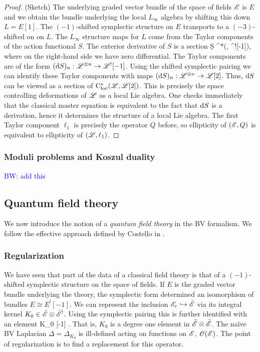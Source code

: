 \documentclass[10pt]{amsart}
\def\brian{\textcolor{blue}{BW: }\textcolor{blue}}
\begin{document}
\begin{proof} (Sketch) 
The underlying graded vector bundle of the space of fields $\mathscr E$ is $E$ and we obtain the bundle underlying the local $L_\infty$ algebra by shifting this down $L = E[1]$. 
The $(-1)$-shifted symplectic structure on $E$ transports to a $(-3)$-shifted on on $L$. 
The $L_\infty$ structure maps for $L$ come from the Taylor components of the action functional $S$. 
The exterior derivative of $S$ is a section
\ben
\d S \in \cloc^*(\sL, \sL^![-1]),
\een
where on the right-hand side we have zero differential.
The Taylor components are of the form $({\rm d} S)_n : \mathscr L^{\otimes n} \to \mathscr L^![-1]$. 
Using the shifted symplectic pairing we can identify these Taylor components with maps $({\rm d} S)_n : \mathscr L^{\otimes n} \to \mathscr L[2]$. 
Thus, ${\rm d} S$ can be viewed as a section of ${\rm C}_{\rm loc}^*(\mathscr L, \mathscr L[2])$. 
This is precisely the space controlling deformations of $\mathscr L$ as a local Lie algebra.
One checks immediately that the classical master equation is equivalent to the fact that ${\rm d} S$ is a derivation, hence it determines the structure of a local Lie algebra. 
The first Taylor component $\ell_1$ is precisely the operator $Q$ before, so ellipticity of $(\mathscr E, Q)$ is equivalent to ellipticity of $(\mathscr L, \ell_1)$. 
\end{proof}


\subsubsection{Moduli problems and Koszul duality}

\brian{add this}

\subsection{Quantum field theory}

We now introduce the notion of a {\em quantum field theory} in the BV formalism.
We follow the effective approach defined by Costello in \cite{CostelloRenormalization}.

\subsubsection{Regularization}

We have seen that part of the data of a classical field theory is that of a $(-1)$-shifted symplectic structure on the space of fields. 
If $E$ is the graded vector bundle underlying the theory, the symplectic form determined an isomorphism of bundles $E \cong E^![-1]$. 
We can represent the inclusion $\mathscr E_c \hookrightarrow \Bar{\mathscr E}$ via its integral kernel $K_0 \in \Bar{\mathscr E} \otimes \Bar{\mathscr E}^!$. 
Using the symplectic pairing this is further identified with an element 
\ben
K_0 \in \Bar{\sE} \tensor \Bar{\sE} [-1] .
\een
That is, $K_0$ is a degree one element in $\Bar{\mathscr E} \otimes \Bar{\mathscr E}$.
The na\"{i}ve BV Laplacian $\Delta = \Delta_{K_0}$ is ill-defined acting on functions on $\mathscr E$, $\mathscr O(\mathscr E)$. 
The point of regularization is to find a replacement for this operator.
\end{document}
